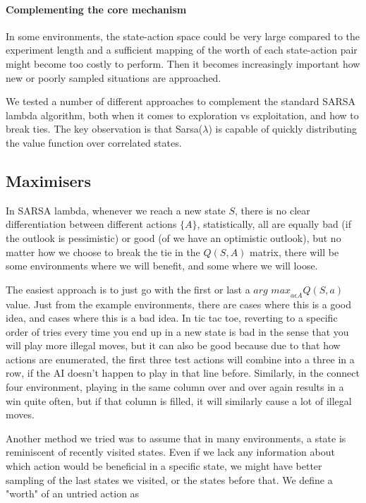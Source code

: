 \paragraph{Complementing the core mechanism}
In some environments, the state-action space could be very large compared to the
experiment length and a sufficient mapping of the worth of each state-action
pair might become too costly to perform. Then it becomes increasingly important
how new or poorly sampled situations are approached.

We tested a number of different approaches to complement the standard SARSA
lambda algorithm, both when it comes to exploration vs exploitation, and how to
break ties. The key observation is that Sarsa($\lambda$) is capable of quickly
distributing the value function over correlated states.

\subsection{Maximisers}

In SARSA lambda, whenever we reach a new state $S$, there is no clear
differentiation between different actions $\{A\}$, statistically, all are
equally bad (if the outlook is pessimistic) or good (of we have an optimistic
outlook), but no matter how we choose to break the tie in the $Q(S,A)$ matrix,
there will be some environments where we will benefit, and some where we will
loose.

The easiest approach is to just go with the first or last a $\textit{arg
    max}_{a\epsilon A} Q(S,a)$ value. Just from the example environments, there
are cases where this is a good idea, and cases where this is a bad idea. In tic
tac toe, reverting to a specific order of tries every time you end up in a new
state is bad in the sense that you will play more illegal moves, but it can also
be good because due to that how actions are enumerated, the first three test
actions will combine into a three in a row, if the AI doesn't happen to play in
that line before. Similarly, in the connect four environment, playing in the
same column over and over again results in a win quite often, but if that column
is filled, it will similarly cause a lot of illegal moves.

Another method we tried was to assume that in many environments, a state is
reminiscent of recently visited states. Even if we lack any information about
which action would be beneficial in a specific state, we might have better
sampling of the last states we visited, or the states before that. We define a
"worth" of an untried action as

